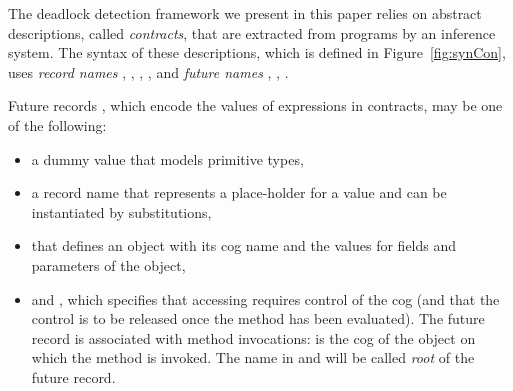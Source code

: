 

The deadlock detection framework we present in this paper relies on 
abstract descriptions, 
called \emph{contracts}, that are extracted from programs by an inference system.
The syntax of these descriptions, which is defined in Figure~\ref{fig:synCon}, 
uses \emph{record names} , , , , and \emph{future names} , ,
.
\begin{figure*}[t]
  \centering
{}
  \caption{Syntax of future records and contracts.}
\label{fig:synCon}
\end{figure*}
Future records , which
encode the values of expressions in contracts, may be one of the
following: 
\begin{itemize}
\item[--]
a dummy value  that models 
primitive types,
\item[--]
a record name  that 
 represents a place-holder for a value and can be
instantiated by substitutions, 
\item[--]

that defines an object with its cog name  and the values for fields and parameters of the object, 
\item[--]
and  
, which specifies that accessing
 requires control of the cog 
(and that the control is to be released once the method has been evaluated).
The future record  is associated with method
invocations:  is the cog of the object on which the method is invoked.
The name  in  and  
will be called \emph{root} of the future record. \end{itemize}

